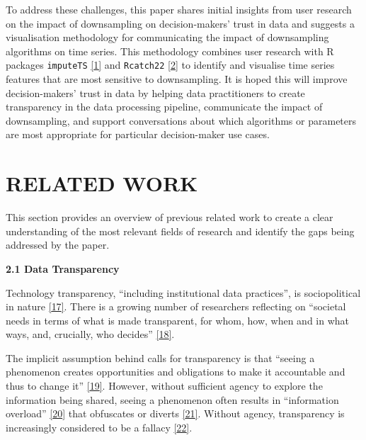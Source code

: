 \documentclass{article}
\begin{document}
To address these challenges, this paper shares initial insights from
user research on the impact of downsampling on decision-makers' trust in
data and suggests a visualisation methodology for communicating the
impact of downsampling algorithms on time series. This methodology
combines user research with R packages \texttt{imputeTS}
\protect\hyperlink{ref-imputeTS_R}{{[}1{]}} and \texttt{Rcatch22}
\protect\hyperlink{ref-catch22_R}{{[}2{]}} to identify and visualise
time series features that are most sensitive to downsampling. It is
hoped this will improve decision-makers' trust in data by helping data
practitioners to create transparency in the data processing pipeline,
communicate the impact of downsampling, and support conversations about
which algorithms or parameters are most appropriate for particular
decision-maker use cases.

\hypertarget{related-work}{%
\section{RELATED WORK}\label{related-work}}

\label{sec:headings}

This section provides an overview of previous related work to create a
clear understanding of the most relevant fields of research and identify
the gaps being addressed by the paper.

\textbf{2.1 Data Transparency}

Technology transparency, ``including institutional data practices'', is
sociopolitical in nature
\protect\hyperlink{ref-political_transparency}{{[}17{]}}. There is a
growing number of researchers reflecting on ``societal needs in terms of
what is made transparent, for whom, how, when and in what ways, and,
crucially, who decides''
\protect\hyperlink{ref-social_transparency}{{[}18{]}}.

The implicit assumption behind calls for transparency is that ``seeing a
phenomenon creates opportunities and obligations to make it accountable
and thus to change it''
\protect\hyperlink{ref-transparency_lack}{{[}19{]}}. However, without
sufficient agency to explore the information being shared, seeing a
phenomenon often results in ``information overload''
\protect\hyperlink{ref-digital_transparency}{{[}20{]}} that obfuscates
or diverts \protect\hyperlink{ref-transparency_obfuscation}{{[}21{]}}.
Without agency, transparency is increasingly considered to be a fallacy
\protect\hyperlink{ref-transparency_fallacy}{{[}22{]}}.
\end{document}
